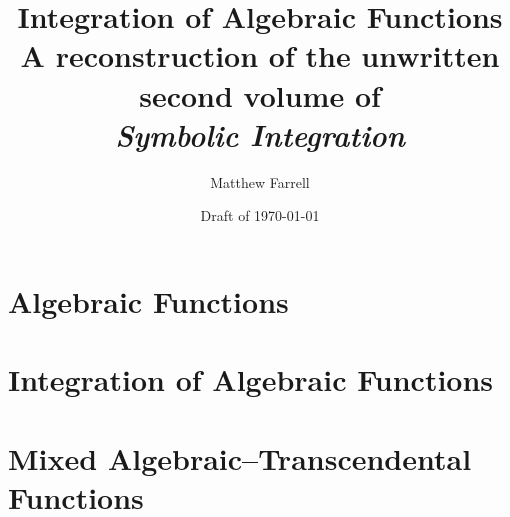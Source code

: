 \documentclass[11pt]{book}
\title{Integration of Algebraic Functions\\[1ex]
  \large A reconstruction of the unwritten second volume of\\
  \emph{Symbolic Integration}}
\author{Matthew Farrell}
\date{Draft of \today}
\begin{document}
\frontmatter
\maketitle

\tableofcontents


\mainmatter
\part{Algebraic Functions}






\part{Integration of Algebraic Functions}








\part{Mixed Algebraic--Transcendental Functions}






\appendix





\backmatter


\printindex
\end{document}
